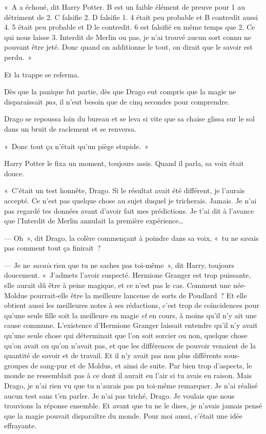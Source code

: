 \restoretrivseps

«~A a échoué, dit Harry Potter. B est un faible élément de preuve pour 1 au détriment de 2. C falsifie 2. D falsifie 1. 4 était peu probable et B contredit aussi 4. 5 était peu probable et D le contredit. 6 est falsifié en même temps que 2. Ce qui nous laisse 3. Interdit de Merlin ou pas, je n'ai trouvé aucun sort connu ne pouvant être jeté. Donc quand on additionne le tout, on dirait que le savoir est perdu.~»

Et la trappe se referma.

Dès que la panique fut partie, dès que Drago eut compris que la magie ne disparaissait \emph{pas}, il n'eut besoin que de cinq secondes pour comprendre.

Drago se repoussa loin du bureau et se leva si vite que sa chaise glissa sur le sol dans un bruit de raclement et se renversa.

«~Donc tout ça n'était qu'un piège stupide.~»

Harry Potter le fixa un moment, toujours assis. Quand il parla, sa voix était douce.

«~C'était un test honnête, Drago. Si le résultat avait été différent, je l'aurais accepté. Ce n'est pas quelque chose au sujet duquel je tricherais. Jamais. Je n'ai pas regardé tes données avant d'avoir fait mes prédictions. Je t'ai dit à l'avance que l'Interdit de Merlin annulait la première expérience…

--- Oh~», dit Drago, la colère commençant à poindre dans sa voix, «~tu ne savais pas comment tout ça finirait~?

--- Je ne \emph{savais} rien que tu ne saches pas toi-même~», dit Harry, toujours doucement. «~J'admets l'avoir suspecté. Hermione Granger est trop puissante, elle aurait dû être à peine magique, et ce n'est pas le cas. Comment une née-Moldue pourrait-elle être la meilleure lanceuse de sorts de Poudlard~? Et elle obtient aussi les meilleures notes à ses rédactions, c'est trop de coïncidences pour qu'une seule fille soit la meilleure en magie \emph{et} en cours, à moins qu'il n'y ait une cause commune. L'existence d'Hermione Granger laissait entendre qu'il n'y avait qu'une seule chose qui déterminait que l'on soit sorcier ou non, quelque chose qu'on avait ou qu'on n'avait pas, et que les différences de pouvoir venaient de la quantité de savoir et de travail. Et il n'y avait pas non plus différents sous-groupes de sang-pur et de Moldus, et ainsi de suite. Par bien trop d'aspects, le monde ne ressemblait pas à ce dont il aurait eu l'air si tu avais eu raison. Mais Drago, je n'ai rien vu que tu n'aurais pas pu toi-même remarquer. Je n'ai réalisé aucun test sans t'en parler. Je n'ai pas triché, Drago. Je voulais que nous trouvions la réponse ensemble. Et avant que tu ne le dises, je n'avais jamais pensé que la magie pouvait disparaître du monde. Pour moi aussi, c'était une idée effrayante.

